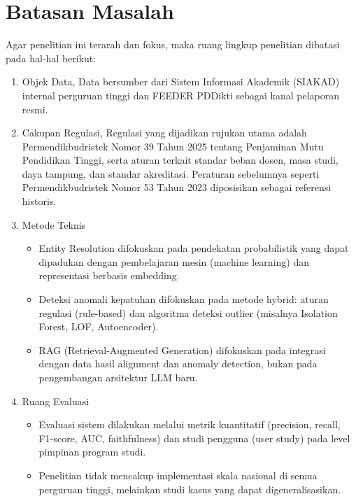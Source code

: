 \documentclass[12pt,a4paper,oneside]{report}
\begin{document}
        \section{Batasan Masalah}
            Agar penelitian ini terarah dan fokus, maka ruang lingkup penelitian dibatasi pada hal-hal berikut:
            \begin{enumerate}
                \item Objek Data, Data bersumber dari Sistem Informasi Akademik (SIAKAD) internal perguruan tinggi dan FEEDER PDDikti sebagai kanal pelaporan resmi.
                \item Cakupan Regulasi, Regulasi yang dijadikan rujukan utama adalah Permendikbudristek Nomor 39 Tahun 2025 tentang Penjaminan Mutu Pendidikan Tinggi, serta aturan terkait standar beban dosen, masa studi, daya tampung, dan standar akreditasi.
                    Peraturan sebelumnya seperti Permendikbudristek Nomor 53 Tahun 2023 diposisikan sebagai referensi historis.
                \item Metode Teknis
                    \begin{itemize}
                        \item Entity Resolution difokuskan pada pendekatan probabilistik yang dapat dipadukan dengan pembelajaran mesin (machine learning) dan representasi berbasis embedding.
                        \item Deteksi anomali kepatuhan difokuskan pada metode hybrid: aturan regulasi (rule-based) dan algoritma deteksi outlier (misalnya Isolation Forest, LOF, Autoencoder).
                        \item RAG (Retrieval-Augmented Generation) difokuskan pada integrasi dengan data hasil alignment dan anomaly detection, bukan pada pengembangan arsitektur LLM baru.
                    \end{itemize}
                \item Ruang Evaluasi
                    \begin{itemize}
                        \item Evaluasi sistem dilakukan melalui metrik kuantitatif (precision, recall, F1-score, AUC, faithfulness) dan studi pengguna (user study) pada level pimpinan program studi.
                        \item Penelitian tidak mencakup implementasi skala nasional di semua perguruan tinggi, melainkan studi kasus yang dapat digeneralisasikan.
                    \end{itemize}
            \end{enumerate}
\end{document}
